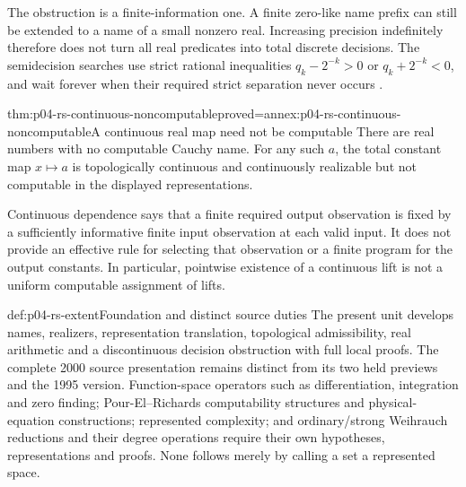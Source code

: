 The obstruction is a finite-information one. A finite zero-like
name prefix can still be extended to a name of a small nonzero
real. Increasing precision indefinitely therefore does not turn
all real predicates into total discrete decisions.
The semidecision searches use strict rational inequalities
\(q_k-2^{-k}>0\) or \(q_k+2^{-k}<0\), and wait forever
when their required strict separation never occurs
\cite[pp.\ 24--25]{Weihrauch1995IntroductionRS}.

\begin{hbtheorem}{thm:p04-rs-continuous-noncomputable}{proved=annex:p04-rs-continuous-noncomputable}{A continuous real map need not be computable}
There are real numbers with no computable Cauchy name.
For any such \(a\), the total constant map \(x\mapsto a\)
is topologically continuous and continuously realizable but
not computable in the displayed representations.
\end{hbtheorem}

Continuous dependence says that a finite required output
observation is fixed by a sufficiently informative finite input
observation at each valid input. It does not provide an effective
rule for selecting that observation or a finite program for
the output constants. In particular, pointwise existence of a
continuous lift is not a uniform computable assignment of lifts.

\begin{proofboundary}{def:p04-rs-extent}{Foundation and distinct source duties}
The present unit develops names, realizers, representation
translation, topological admissibility, real arithmetic and a
discontinuous decision obstruction with full local proofs.
The complete 2000 source presentation remains distinct from
its two held previews and the 1995 version.
Function-space operators such as differentiation, integration and
zero finding; Pour-El--Richards computability structures and
physical-equation constructions; represented complexity; and
ordinary/strong Weihrauch reductions and their degree operations
require their own hypotheses, representations and proofs.
None follows merely by calling a set a represented space.
\end{proofboundary}
